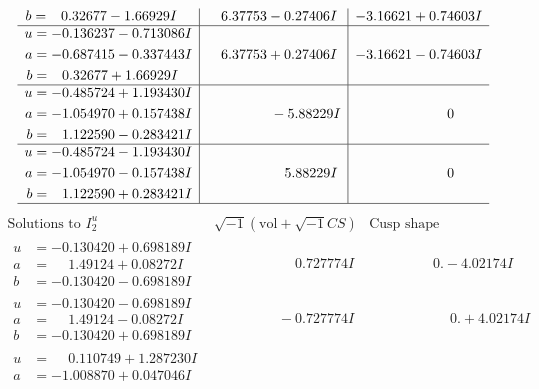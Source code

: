 \documentclass[1p]{elsarticle_modified}
\theoremstyle{definition}
\newcommand{\I}{\sqrt{-1}}
\begin{document}
$$\begin{array}{c|c|c}
\begin{aligned}
b &= \phantom{-}0.32677 - 1.66929 I\end{aligned}
 & \phantom{-}6.37753 - 0.27406 I & -3.16621 + 0.74603 I \\ \hline\begin{aligned}
u &= -0.136237 - 0.713086 I \\
a &= -0.687415 - 0.337443 I \\
b &= \phantom{-}0.32677 + 1.66929 I\end{aligned}
 & \phantom{-}6.37753 + 0.27406 I & -3.16621 - 0.74603 I \\ \hline\begin{aligned}
u &= -0.485724 + 1.193430 I \\
a &= -1.054970 + 0.157438 I \\
b &= \phantom{-}1.122590 - 0.283421 I\end{aligned}
 & \phantom{-0.000000 } -5.88229 I & \phantom{-0.000000 } 0 \\ \hline\begin{aligned}
u &= -0.485724 - 1.193430 I \\
a &= -1.054970 - 0.157438 I \\
b &= \phantom{-}1.122590 + 0.283421 I\end{aligned}
 & \phantom{-0.000000 -}5.88229 I & \phantom{-0.000000 } 0\\
 \hline 
 \end{array}$$\newpage$$\begin{array}{c|c|c}  
\text{Solutions to }I^u_{2}& \I (\text{vol} + \sqrt{-1}CS) & \text{Cusp shape}\\
 \hline 
\begin{aligned}
u &= -0.130420 + 0.698189 I \\
a &= \phantom{-}1.49124 + 0.08272 I \\
b &= -0.130420 - 0.698189 I\end{aligned}
 & \phantom{-0.000000 -}0.727774 I & \phantom{-0.000000 } 0. - 4.02174 I \\ \hline\begin{aligned}
u &= -0.130420 - 0.698189 I \\
a &= \phantom{-}1.49124 - 0.08272 I \\
b &= -0.130420 + 0.698189 I\end{aligned}
 & \phantom{-0.000000 } -0.727774 I & \phantom{-0.000000 -}0. + 4.02174 I \\ \hline\begin{aligned}
u &= \phantom{-}0.110749 + 1.287230 I \\
a &= -1.008870 + 0.047046 I \\

\end{aligned}
\end{array}$$
\end{document}
